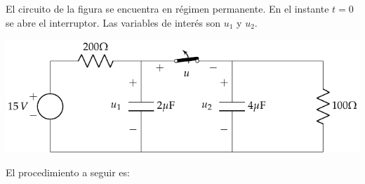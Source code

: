 \documentclass[a4paper,10pt]{article} %
\begin{document}

\vspace{1cm}


El circuito de la figura se encuentra en régimen permanente. En el
instante $t=0$ se abre el interruptor. Las variables de interés son
$u_1$ y $u_2$.
\begin{center}
  \includegraphics{../figs/ej2_BT4.pdf}
\end{center}

El procedimiento a seguir es:
\end{document}
